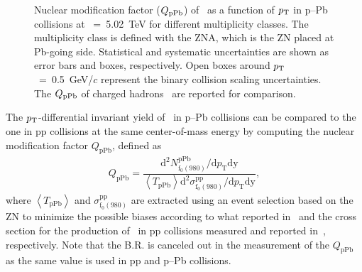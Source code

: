\begin{figure}[!hbt]
	\centering
	\caption{ Nuclear modification factor ($Q_{\rm{pPb}}$) of \fzero~as a function of $p_{\rm{T}}$ in p--Pb collisions at \snn~=~5.02~TeV for different multiplicity classes. The multiplicity class is defined with the ZNA, which is the ZN placed at Pb-going side. Statistical and systematic uncertainties are shown as error bars and boxes, respectively. Open boxes around $p_{\rm{T}}$~=~0.5~GeV/$c$ represent the binary collision scaling uncertainties. The $Q_{\rm{pPb}}$ of charged hadrons~\cite{ALICE:2014xsp} are reported for comparison. }
	\label{fig:QpPb}
\end{figure}

The $p_{\rm{T}}$-differential invariant yield of \fzero~in p--Pb collisions can be compared to the one in pp collisions at the same center-of-mass energy by computing the nuclear modification factor $Q_{\mbox{pPb}}$, defined as 
\begin{eqnarray}
Q_{\mbox{pPb}} = \dfrac{\mathrm{d}^{2} N_{\mathrm{f}_{0}(980)}^{\mathrm{pPb}} / \mathrm{d} p_{\mathrm{T}} \mathrm{dy} }{ \left\langle T_{\mathrm{pPb}} \right\rangle \mathrm{d}^{2} \sigma_{\mathrm{f}_{0}(980)}^{\mathrm{pp}}/ \mathrm{d} p_{\mathrm{T}} \mathrm{dy} },
\end{eqnarray}
where $\left\langle T_{\mathrm{pPb}} \right\rangle$ and $\sigma_{\mathrm{f}_{0}(980)}^{\mathrm{pp}}$ are extracted using an event selection based on the
ZN to minimize the possible biases according to what reported in~\cite{ALICE:2014xsp} and the cross section for the production of \fzero~in pp collisions measured and reported in~\cite{ALICE:2022qnb}, respectively. Note that the B.R. is canceled out in the measurement of the $Q_{\mbox{pPb}}$ as the same value is used in pp and p--Pb collisions.

